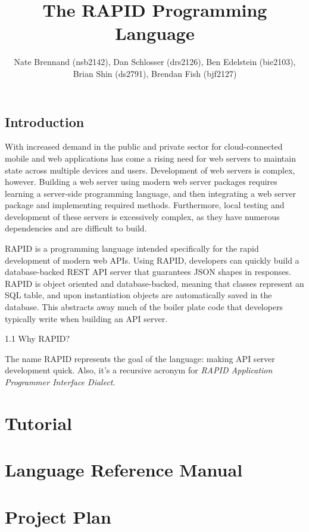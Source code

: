 \documentclass[11pt]{article}
\author{
  Nate Brennand (nsb2142),
  Dan Schlosser (drs2126),
  Ben Edelstein (bie2103),
  Brian Shin (ds2791),
  Brendan Fish (bjf2127)
}
\title{The RAPID Programming Language}
\begin{document}
\setlength{\parskip}{.1 in}

\maketitle
\newpage

\subsection*{Introduction}

With increased demand in the public and private sector for cloud-connected mobile and web applications has come a rising need for web servers to maintain state across multiple devices and users.
Development of web servers is complex, however. Building a web server using modern web server packages requires learning a server-side programming language, and then integrating a web server package and implementing required methods.
Furthermore, local testing and development of these servers is excessively complex, as they have numerous dependencies and are difficult to build.

RAPID is a programming language intended specifically for the rapid development of modern web APIs.
Using RAPID, developers can quickly build a database-backed REST API server that guarantees JSON shapes in responses.
RAPID is object oriented and database-backed, meaning that classes represent an SQL table, and upon instantiation objects are automatically saved in the database.
This abstracts away much of the boiler plate code that developers typically write when building an API server.


1.1 Why RAPID?

The name RAPID represents the goal of the language: making API server development quick.
Also, it's a recursive acronym for \textit{RAPID Application Programmer Interface Dialect}.



\section*{Tutorial}
 \newpage

\section*{Language Reference Manual}
 \newpage

\section*{Project Plan}
 \newpage
\end{document}
